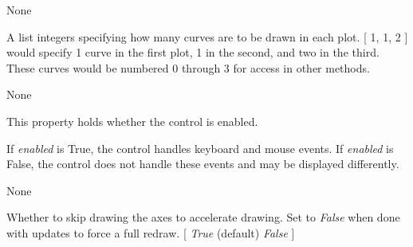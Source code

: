 \documentclass[letterpaper,10pt,english]{sphinxmanual}
\begin{document}
\begin{fulllineitems}

\begin{fulllineitems}
\label{api:mpl.Chart2D.clear_events}
None

\end{fulllineitems}


\begin{fulllineitems}
\label{api:mpl.Chart2D.curves_per_plot}
A list integers specifying how many curves are to be drawn in each
plot. {[} 1, 1, 2 {]} would specify 1 curve in the first plot, 1 in the 
second, and two in the third. These curves would be numbered 0 through 
3 for access in other methods.

\end{fulllineitems}


\begin{fulllineitems}
\label{api:mpl.Chart2D.draw_action}
None

\end{fulllineitems}


\begin{fulllineitems}
\label{api:mpl.Chart2D.enabled}
This property holds whether the control is enabled.

If \emph{enabled} is True, the control handles keyboard and mouse events.
If \emph{enabled} is False, the control does not handle these events and may
be displayed differently.

\end{fulllineitems}


\begin{fulllineitems}
\label{api:mpl.Chart2D.events_length}
None

\end{fulllineitems}


\begin{fulllineitems}
\label{api:mpl.Chart2D.fast}
Whether to skip drawing the axes to accelerate drawing. Set to 
\emph{False} when done with updates to force a full redraw.
{[} \emph{True} (default) \textbar{} \emph{False} {]}


\end{fulllineitems}
\end{fulllineitems}
\end{document}
